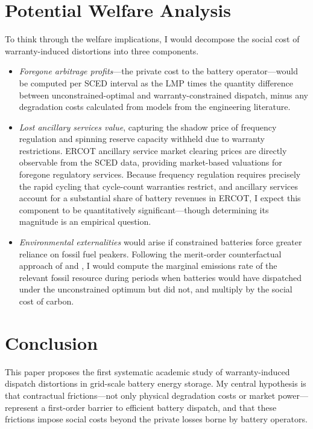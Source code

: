 \documentclass[12pt]{article}
\begin{document}
\section{Potential Welfare Analysis}

To think through the welfare implications, I would decompose the social cost of warranty-induced distortions into three components. 
\begin{itemize}
    \item \textit{Foregone arbitrage profits}---the private cost to the battery operator---would be computed per SCED interval as the LMP times the quantity difference between unconstrained-optimal and warranty-constrained dispatch, minus any degradation costs calculated from models from the engineering literature. 
    \item \textit{Lost ancillary services value}, capturing the shadow price of frequency regulation and spinning reserve capacity withheld due to warranty restrictions.  ERCOT ancillary service market clearing prices are directly observable from the SCED data, providing market-based valuations for foregone regulatory services. Because frequency regulation requires precisely the rapid cycling that cycle-count warranties restrict, and ancillary services account for a substantial share of battery revenues in ERCOT, I expect this component to be quantitatively significant---though determining its magnitude is an empirical question.
    \item \textit{Environmental externalities} would arise if constrained batteries force greater reliance on fossil fuel peakers. Following the merit-order counterfactual approach of \citet{cicala2022} and \citet{gonzales2023}, I would compute the marginal emissions rate of the relevant fossil resource during periods when batteries would have dispatched under the unconstrained optimum but did not, and multiply by the social cost of carbon. 
\end{itemize}


\section{Conclusion}

This paper proposes the first systematic academic study of warranty-induced dispatch distortions in grid-scale battery energy storage. My central hypothesis is that contractual frictions---not only physical degradation costs or market power---represent a first-order barrier to efficient battery dispatch, and that these frictions impose social costs beyond the private losses borne by battery operators.
\end{document}
